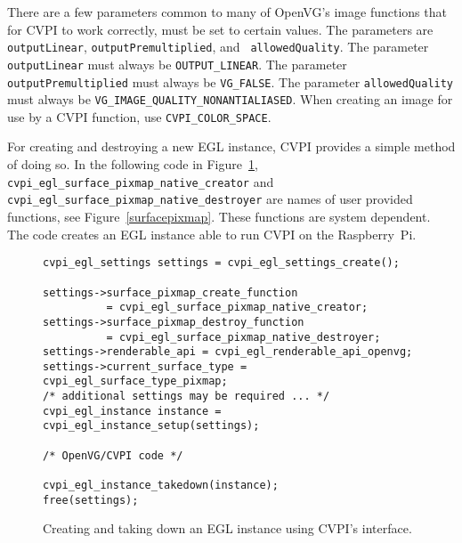 \documentclass[12pt]{report}
\begin{document}
There are a few parameters common to many of OpenVG's image functions
that for CVPI to work correctly, must be set to certain values. The
parameters are {\tt outputLinear}, {\tt outputPremultiplied}, and {\tt
  allowedQuality}.  The parameter {\tt outputLinear} must always be
{\tt OUTPUT\_LINEAR}. The parameter {\tt outputPremultiplied} must
always be {\tt VG\_FALSE}. The parameter {\tt allowedQuality} must
always be {\tt VG\_IMAGE\_QUALITY\_NONANTIALIASED}. When creating an
image for use by a CVPI function, use {\tt CVPI\_COLOR\_SPACE}.

For creating and destroying a new EGL instance, CVPI provides a simple
method of doing so. In the following code in Figure~\ref{eglcreate}, {\tt
  cvpi\_egl\_surface\_pixmap\_native\_creator} and {\tt
  cvpi\_egl\_surface\_pixmap\_native\_destroyer} are names of user provided
functions, see Figure~\ref{surfacepixmap}. These functions are system
dependent. The code creates an EGL instance able to run CVPI on the
Raspberry~Pi.

\begin{figure}[H]
  \begin{lstlisting}[frame=single, basicstyle=\footnotesize]
cvpi_egl_settings settings = cvpi_egl_settings_create();

settings->surface_pixmap_create_function
          = cvpi_egl_surface_pixmap_native_creator;
settings->surface_pixmap_destroy_function
          = cvpi_egl_surface_pixmap_native_destroyer;
settings->renderable_api = cvpi_egl_renderable_api_openvg;
settings->current_surface_type = cvpi_egl_surface_type_pixmap;
/* additional settings may be required ... */
cvpi_egl_instance instance = cvpi_egl_instance_setup(settings);

/* OpenVG/CVPI code */

cvpi_egl_instance_takedown(instance);
free(settings);
\end{lstlisting}
  \caption{Creating and taking down an EGL instance using CVPI's interface.}
  \label{eglcreate}
\end{figure}
\end{document}
